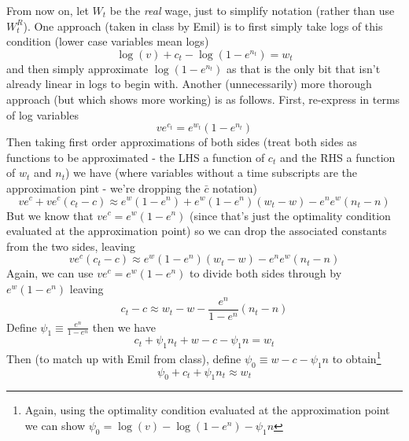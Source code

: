 \documentclass[authoryear,11pt]{elsarticle}
\begin{document}
From now on, let $W_{t}$ be the \emph{real} wage, just to simplify notation (rather than use $W^{R}_{t}$). One approach (taken in class by Emil) is to first simply take logs of this condition (lower case variables mean logs)
\[
\log{(v)} + c_{t} - \log{(1-e^{n_{t}})} = w_{t}
\]
and then simply approximate $\log{(1-e^{n_{t}})}$ as that is the only bit that isn't already linear in logs to begin with. Another (unnecessarily) more thorough approach (but which shows more working) is as follows.
First, re-express in terms of log variables
\[
ve^{c_{t}}=e^{w_{t}}(1-e^{n_{t}})
\]
Then taking first order approximations of both sides (treat both sides as functions to be approximated - the LHS a function of $c_{t}$ and the RHS a function of $w_{t}$ and $n_{t}$) we have (where variables without a time subscripts are the approximation pint - we're dropping the $\bar{c}$ notation)
\[
v e^{c} + v e^{c} (c_{t}-c) \approx e^{w}(1-e^{n}) + e^{w}(1-e^{n})(w_{t}-w) -e^{n}e^{w}(n_{t}-n)
\]
But we know that $v e^{c} = e^{w}(1-e^{n})$ (since that's just the optimality condition evaluated at the approximation point) so we can drop the associated constants from the two sides, leaving
\[
v e^{c} (c_{t}-c) \approx e^{w}(1-e^{n})(w_{t}-w) -e^{n}e^{w}(n_{t}-n)
\]
Again, we can use $v e^{c} = e^{w}(1-e^{n})$ to divide both sides through by $e^{w}(1-e^{n})$ leaving
\[
c_{t}-c \approx w_{t}-w -\frac{e^{n}}{1-e^{n}}(n_{t}-n)
\]
Define $\psi_{1}\equiv \frac{e^{n}}{1-e^{n}}$ then we have
\[
c_{t} + \psi_1 n_{t} + w - c - \psi_{1}n = w_{t}
\]
Then (to match up with Emil from class), define $\psi_{0}\equiv w - c - \psi_{1} n$ to obtain\footnote{Again, using the optimality condition evaluated at the approximation point we can show $\psi_{0}= \log{(v)}-\log{(1-e^{n})}- \psi_{1}n$}
\[
\psi_{0} + c_{t} + \psi_{1}n_{t} \approx w_{t}
\]
\end{document}
